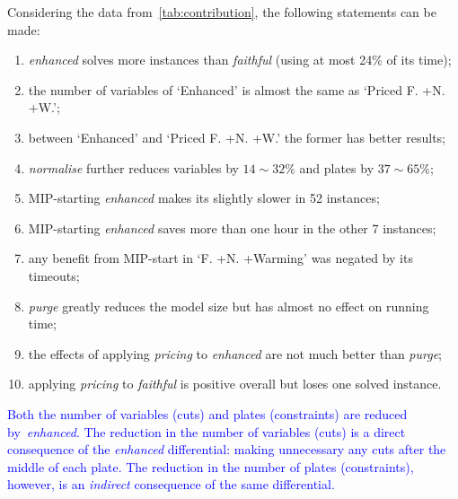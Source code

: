 \documentclass[ppgc,tese,english,formais,babel]{iiufrgs}
\newif\iffinalversion
\newcommand{\newtext}[1]{\iffinalversion%
#1%
\else%
\textcolor{blue}{#1}%
\fi%
}
\begin{document}
Considering the data from~\cref{tab:contribution}, the following statements can be made:
\begin{enumerate}
\item \emph{enhanced} solves more instances than \emph{faithful} (using at most 24\% of its time);
\item the number of variables of `Enhanced' is almost the same as `Priced F. +N. +W.';
\item between `Enhanced' and `Priced F. +N. +W.' the former has better results;
\item \emph{normalise} further reduces variables by \(14\sim32\)\% and plates by \(37\sim65\)\%;
\item MIP-starting \emph{enhanced} makes its slightly slower in 52 instances;
\item MIP-starting \emph{enhanced} saves more than one hour in the other 7 instances;
\item any benefit from MIP-start in `F. +N. +Warming' was negated by its timeouts;
\item \emph{purge} greatly reduces the model size but has almost no effect on running time;
\item the effects of applying \emph{pricing} to \emph{enhanced} are not much better than \emph{purge};
\item applying \emph{pricing} to \emph{faithful} is positive overall but loses one solved instance.
\end{enumerate}

\newtext{
Both the number of variables (cuts) and plates (constraints) are reduced by~\emph{enhanced}.
The reduction in the number of variables (cuts) is a direct consequence of the \emph{enhanced} differential: making unnecessary any cuts after the middle of each plate.
The reduction in the number of plates (constraints), however, is an \emph{indirect} consequence of the same differential.
}
\end{document}
